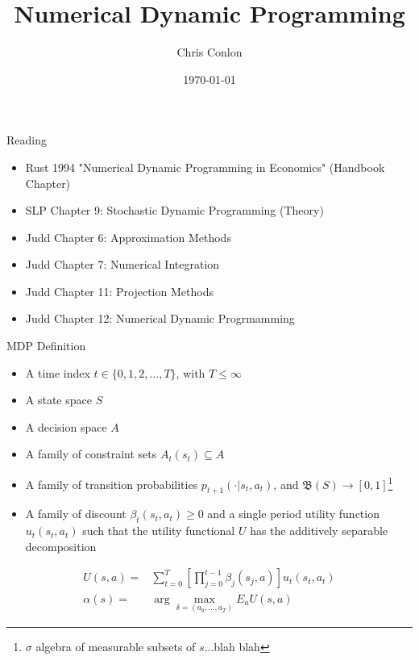\documentclass[xcolor=pdftex,dvipsnames,table,mathserif]{beamer}
\title [Single-agent dynamic optimization models]{Numerical Dynamic Programming}
\author{Chris Conlon  }
\institute{Grad IO}
\date{\today }
\begin{document}
\begin{frame}
\titlepage
\end{frame}

\begin{frame}{Reading}
\begin{itemize}
\item Rust 1994 "Numerical Dynamic Programming in Economics" (Handbook Chapter)
\item SLP Chapter 9: Stochastic Dynamic Programming (Theory)
\item Judd Chapter 6: Approximation Methods
\item Judd Chapter 7: Numerical Integration
\item Judd Chapter 11: Projection Methods
\item Judd Chapter 12: Numerical Dynamic Progrmamming
\end{itemize}
\end{frame}


\begin{frame}{MDP Definition}
\begin{itemize}
\item A time index $t \in\{0,1,2,\ldots,T\}$, with $T \leq \infty$
\item A state space $S$
\item A decision space $A$
\item A family of constraint sets $A_t(s_t) \subseteq A$
\item A family of transition probabilities $p_{t+1}(\cdot | s_t,a_t)$, and $\mathfrak{B}(S) \rightarrow [0,1]$\footnote{$\sigma$ algebra of measurable subsets of $s$...blah blah}
\item A family of discount $\beta_t(s_t,a_t ) \geq 0$ and a single period utility function $u_t(s_t,a_t)$ such that the utility functional $U$ has the additively separable decomposition
\end{itemize}
\begin{eqnarray*}
U(s,a) = &\sum_{t=0}^T \left [ \prod_{j=0}^{t-1} \beta_j (s_j,a) \right] u_t(s_t,a_t) \\
\alpha(s) =&\arg \max_{\delta=(a_0,\ldots,a_T)} E_{a} U(s,a)
\end{eqnarray*}
\end{frame}
\end{document}
